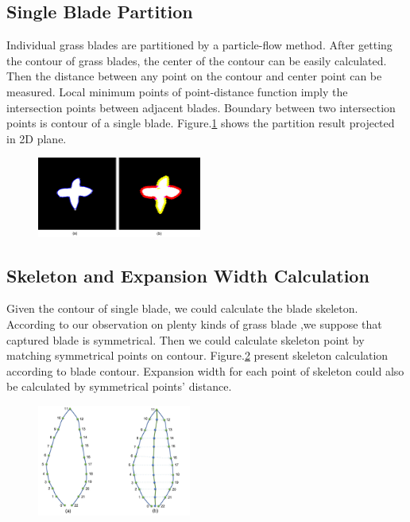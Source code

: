 \documentclass[10pt,journal,compsoc]{IEEEtran}
\begin{document}
\subsection{Single Blade Partition}

Individual grass blades are partitioned by a particle-flow method\cite{neubert2007approximate}. After getting the contour of grass blades, the center of the contour can be easily calculated. Then the distance between any point on the contour and center point can be measured. Local minimum points of point-distance function imply the intersection points between adjacent blades. Boundary between two intersection points is contour of a single blade. Figure.\ref{fig:partition} shows the partition result projected in 2D plane.

\begin{figure}
    \centering
    \includegraphics[width=0.48\textwidth]{figs/contour_partition.jpg}
    \label{fig:partition}
\end{figure}

\subsection{Skeleton and Expansion Width Calculation}
Given the contour of single blade, we could calculate the blade skeleton. According to our observation on plenty kinds of grass blade ,we suppose that captured blade is symmetrical. Then we could calculate skeleton point by matching symmetrical points on contour. Figure.\ref{fig:skeleton} present skeleton calculation according to blade contour. Expansion width for each point of skeleton could also be calculated by symmetrical points' distance.

\begin{figure}
    \centering
    \includegraphics[width=0.45\textwidth]{figs/skeletoncal.jpg}
    \label{fig:skeleton}
\end{figure}
\end{document}
